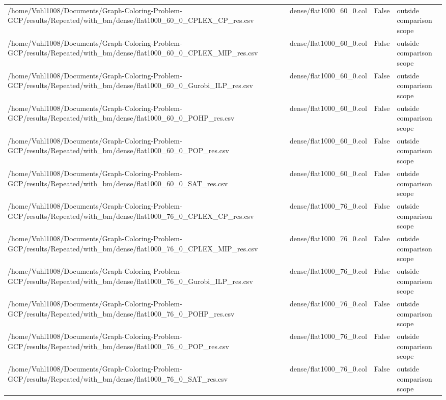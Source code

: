 \begin{table}[htbp]
\begin{tabular}{llll}
/home/Vuhl1008/Documents/Graph-Coloring-Problem-GCP/results/Repeated/with\_bm/dense/flat1000\_60\_0\_CPLEX\_CP\_res.csv & dense/flat1000\_60\_0.col & False & outside comparison scope \\
/home/Vuhl1008/Documents/Graph-Coloring-Problem-GCP/results/Repeated/with\_bm/dense/flat1000\_60\_0\_CPLEX\_MIP\_res.csv & dense/flat1000\_60\_0.col & False & outside comparison scope \\
/home/Vuhl1008/Documents/Graph-Coloring-Problem-GCP/results/Repeated/with\_bm/dense/flat1000\_60\_0\_Gurobi\_ILP\_res.csv & dense/flat1000\_60\_0.col & False & outside comparison scope \\
/home/Vuhl1008/Documents/Graph-Coloring-Problem-GCP/results/Repeated/with\_bm/dense/flat1000\_60\_0\_POHP\_res.csv & dense/flat1000\_60\_0.col & False & outside comparison scope \\
/home/Vuhl1008/Documents/Graph-Coloring-Problem-GCP/results/Repeated/with\_bm/dense/flat1000\_60\_0\_POP\_res.csv & dense/flat1000\_60\_0.col & False & outside comparison scope \\
/home/Vuhl1008/Documents/Graph-Coloring-Problem-GCP/results/Repeated/with\_bm/dense/flat1000\_60\_0\_SAT\_res.csv & dense/flat1000\_60\_0.col & False & outside comparison scope \\
/home/Vuhl1008/Documents/Graph-Coloring-Problem-GCP/results/Repeated/with\_bm/dense/flat1000\_76\_0\_CPLEX\_CP\_res.csv & dense/flat1000\_76\_0.col & False & outside comparison scope \\
/home/Vuhl1008/Documents/Graph-Coloring-Problem-GCP/results/Repeated/with\_bm/dense/flat1000\_76\_0\_CPLEX\_MIP\_res.csv & dense/flat1000\_76\_0.col & False & outside comparison scope \\
/home/Vuhl1008/Documents/Graph-Coloring-Problem-GCP/results/Repeated/with\_bm/dense/flat1000\_76\_0\_Gurobi\_ILP\_res.csv & dense/flat1000\_76\_0.col & False & outside comparison scope \\
/home/Vuhl1008/Documents/Graph-Coloring-Problem-GCP/results/Repeated/with\_bm/dense/flat1000\_76\_0\_POHP\_res.csv & dense/flat1000\_76\_0.col & False & outside comparison scope \\
/home/Vuhl1008/Documents/Graph-Coloring-Problem-GCP/results/Repeated/with\_bm/dense/flat1000\_76\_0\_POP\_res.csv & dense/flat1000\_76\_0.col & False & outside comparison scope \\
/home/Vuhl1008/Documents/Graph-Coloring-Problem-GCP/results/Repeated/with\_bm/dense/flat1000\_76\_0\_SAT\_res.csv & dense/flat1000\_76\_0.col & False & outside comparison scope \\

\end{tabular}
\end{table}
